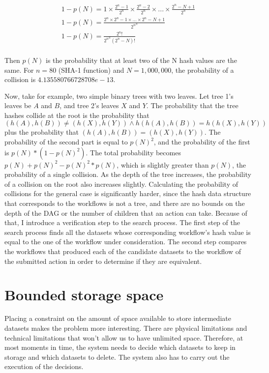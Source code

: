 \begin{multline}
	1 - p(N) = 1 \times \frac{2^n - 1}{2^n} \times \frac{2^n - 2}{2^n} \times . . . \times \frac{2^n - N + 1}{2^n} \\ 
	1 - p(N) = \frac{2^n \times 2^n - 1 \times . . . \times 2^n - N + 1}{2^{n^{N}}} \\ 
	1 - p(N) = \frac{2^n !}{2^{n{^N}} (2^n - N)!} \\
\end{multline}

Then $p(N)$ is the probability that at least two of the N hash values are the same.  For $n=80$ (SHA-1 function) and $N=1,000,000$, the probability of a collision is $4.135580766728708e-13$. 

Now, take for example, two simple binary trees with two leaves.  Let tree 1's leaves be $A$ and $B$, and tree 2's leaves $X$ and $Y$.   The probability that the tree hashes collide at the root is the probability that $(h(A), h(B)) \neq (h(X), h(Y))  \wedge h(h(A), h(B)) = h(h(X), h(Y))$ plus the probability that $(h(A), h(B)) = (h(X), h(Y))$.  The probability of the second part is equal to $p(N)^2$, and the probability of the first is $p(N) * (1 - p(N)^2)$. The total probability becomes $p(N) + p(N)^2 - p(N)^2 * p(N)$, which is slightly greater than $p(N)$, the probability of a single collision.  As the depth of the tree increases, the probability of a collision on the root also increases slightly.  Calculating the probability of collisions for the general case is significantly harder, since the hash data structure that corresponds to the workflows is not a tree, and there are no bounds on the depth of the DAG or the number of children that an action can take.  Because of that, I introduce a verification step to the search process.  The first step of the search process finds all the datasets whose corresponding workflow's hash value is equal to the one of the workflow under consideration. The second step compares the workflows that produced each of the candidate datasets to the workflow of the submitted action in order to determine if they are equivalent.

\section{Bounded storage space}
Placing a constraint on the amount of space available to store intermediate datasets makes the problem more interesting. There are physical limitations and technical limitations that won't allow us to have unlimited space.  Therefore, at most moments in time, the system needs to decide which datasets to keep in storage and which datasets to delete. The system also has to carry out the execution of the decisions.

